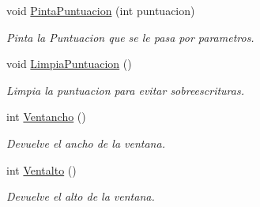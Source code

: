 \begin{CompactItemize}
void \hyperlink{class_config_4f1b69ffddd53323755b960ceaa07281}{PintaPuntuacion} (int puntuacion)
\begin{CompactList}\small\item\em Pinta la Puntuacion que se le pasa por parametros. \item\end{CompactList}\item 
void \hyperlink{class_config_41b3ad0b583abb4dcd8a0119d5bdb166}{LimpiaPuntuacion} ()
\begin{CompactList}\small\item\em Limpia la puntuacion para evitar sobreescrituras. \item\end{CompactList}\item 
int \hyperlink{class_config_80c099b02be9635d3245daf2e05bb6e6}{Ventancho} ()
\begin{CompactList}\small\item\em Devuelve el ancho de la ventana. \item\end{CompactList}\item 
int \hyperlink{class_config_db1372196f96192c9c8a77ff8c3147c7}{Ventalto} ()
\begin{CompactList}\small\item\em Devuelve el alto de la ventana. \item\end{CompactList}\end{CompactItemize}
